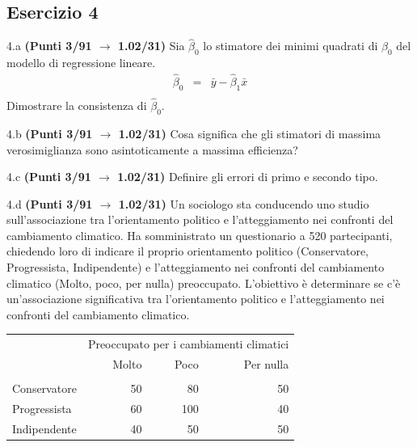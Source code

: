 \documentclass[
  11pt,
]{book}
\theoremstyle{mytheoremstyle}
\theoremstyle{mydefstyle}
\begin{document}
\subsection{Esercizio 4}\label{esercizio-4-32}

4.a \textbf{(Punti 3/91 \(\rightarrow\) 1.02/31)} Sia \(\hat \beta_0\) lo stimatore dei minimi quadrati di \(\beta_0\) del modello di regressione lineare.
\begin{eqnarray*}
  \hat\beta_0 &=&\bar y-  \hat\beta_1\bar x\\
\end{eqnarray*}
Dimostrare la consistenza di \(\hat\beta_0\).

4.b \textbf{(Punti 3/91 \(\rightarrow\) 1.02/31)} Cosa significa che gli stimatori di massima verosimiglianza sono asintoticamente a massima efficienza?

4.c \textbf{(Punti 3/91 \(\rightarrow\) 1.02/31)} Definire gli errori di primo e secondo tipo.

4.d \textbf{(Punti 3/91 \(\rightarrow\) 1.02/31)} Un sociologo sta conducendo uno studio sull'associazione tra l'orientamento politico e l'atteggiamento nei confronti del cambiamento climatico. Ha somministrato un questionario a 520 partecipanti, chiedendo loro di indicare il proprio orientamento politico (Conservatore, Progressista, Indipendente) e l'atteggiamento nei confronti del cambiamento climatico (Molto, poco, per nulla) preoccupato. L'obiettivo è determinare se c'è un'associazione significativa tra l'orientamento politico e l'atteggiamento nei confronti del cambiamento climatico.

\begin{table}[H]
\centering\centering\centering
\begin{tabular}{lrrr}
\toprule
\multicolumn{1}{c}{ } & \multicolumn{3}{c}{Preoccupato per i cambiamenti climatici} \\
\cmidrule(l{3pt}r{3pt}){2-4}
  & Molto & Poco & Per nulla\\
\midrule
\addlinespace[0.3em]
\multicolumn{4}{l}{\textbf{Orientamento politico}}\\
\hspace{1em}Conservatore & 50 & 80 & 50\\
\hspace{1em}Progressista & 60 & 100 & 40\\
\hspace{1em}Indipendente & 40 & 50 & 50\\
\bottomrule
\end{tabular}
\end{table}
\end{document}
